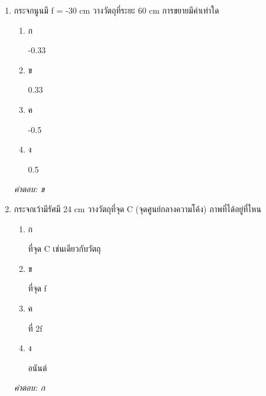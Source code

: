 \documentclass[12pt]{article}
\begin{document}
\begin{enumerate}[label=\arabic*., itemsep=0.5\baselineskip, topsep=0.5\baselineskip, leftmargin=*]
\item กระจกนูนมี f = -30 cm วางวัตถุที่ระยะ 60 cm การขยายมีค่าเท่าใด
\begin{enumerate}[label=\alph*)., itemsep=0.3\baselineskip, topsep=0.3\baselineskip]
\item ก\ 
\begin{minipage}[t]{0.9\linewidth}
\raggedright -0.33
\end{minipage}
\item ข\ 
\begin{minipage}[t]{0.9\linewidth}
\raggedright 0.33
\end{minipage}
\item ค\ 
\begin{minipage}[t]{0.9\linewidth}
\raggedright -0.5
\end{minipage}
\item ง\ 
\begin{minipage}[t]{0.9\linewidth}
\raggedright 0.5
\end{minipage}
\end{enumerate}
\vspace{-0.3\baselineskip}
\begin{small}
\textit{คำตอบ: ข}
\end{small}

\item กระจกเว้ามีรัศมี 24 cm วางวัตถุที่จุด C (จุดศูนย์กลางความโค้ง) ภาพที่ได้อยู่ที่ไหน
\begin{enumerate}[label=\alph*)., itemsep=0.3\baselineskip, topsep=0.3\baselineskip]
\item ก\ 
\begin{minipage}[t]{0.9\linewidth}
\raggedright ที่จุด C เช่นเดียวกับวัตถุ
\end{minipage}
\item ข\ 
\begin{minipage}[t]{0.9\linewidth}
\raggedright ที่จุด f
\end{minipage}
\item ค\ 
\begin{minipage}[t]{0.9\linewidth}
\raggedright ที่ 2f
\end{minipage}
\item ง\ 
\begin{minipage}[t]{0.9\linewidth}
\raggedright อนันต์
\end{minipage}
\end{enumerate}
\vspace{-0.3\baselineskip}
\begin{small}
\textit{คำตอบ: ก}
\end{small}


\end{enumerate}
\end{document}
